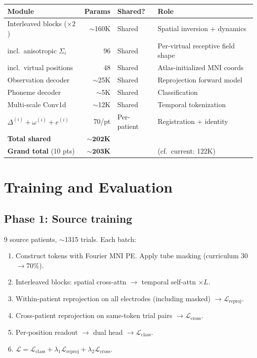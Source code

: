 \documentclass[11pt,letterpaper]{article}
\begin{document}
\begin{table}[ht!]\centering\small
\begin{tabular}{@{}lrll@{}}
\toprule
\textbf{Module} & \textbf{Params} & \textbf{Shared?} & \textbf{Role} \\
\midrule
Interleaved blocks ($\times 2$) & ${\sim}$160K & Shared & Spatial inversion + dynamics \\
\quad incl.\ anisotropic $\Sigma_i$ & 96 & Shared & Per-virtual receptive field shape \\
\quad incl.\ virtual positions & 48 & Shared & Atlas-initialized MNI coords \\
Observation decoder & ${\sim}$25K & Shared & Reprojection forward model \\
Phoneme decoder & ${\sim}$5K & Shared & Classification \\
Multi-scale Conv1d & ${\sim}$12K & Shared & Temporal tokenization \\
\midrule
$\Delta^{(i)} + \omega^{(i)} + e^{(i)}$ & 70/pt & Per-patient & Registration + identity \\
\midrule
\textbf{Total shared} & $\mathbf{{\sim}202}$\textbf{K} & & \\
\textbf{Grand total} (10 pts) & $\mathbf{{\sim}203}$\textbf{K} & & (cf.\ current: 122K) \\
\bottomrule
\end{tabular}
\end{table}



\section{Training and Evaluation}\label{sec:training}

\subsection{Phase 1: Source training}

9 source patients, ${\sim}$1315 trials. Each batch:
\begin{enumerate}[leftmargin=2em]
\item Construct tokens with Fourier MNI PE. Apply tube masking (curriculum 30$\to$70\%).
\item Interleaved blocks: spatial cross-attn $\to$ temporal self-attn $\times L$.
\item Within-patient reprojection on all electrodes (including masked) $\to \mathcal{L}_{\text{reproj}}$.
\item Cross-patient reprojection on same-token trial pairs $\to \mathcal{L}_{\text{cross}}$.
\item Per-position readout $\to$ dual head $\to \mathcal{L}_{\text{class}}$.
\item $\mathcal{L} = \mathcal{L}_{\text{class}} + \lambda_1 \mathcal{L}_{\text{reproj}} + \lambda_2 \mathcal{L}_{\text{cross}}$.
\end{enumerate}
\end{document}
